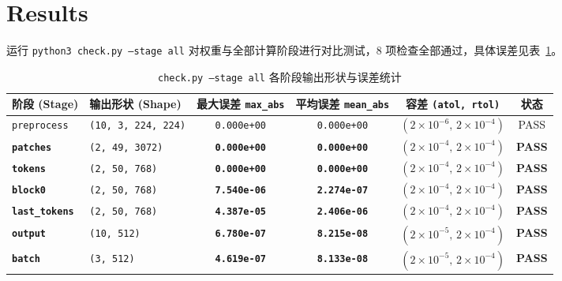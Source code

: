 \documentclass[a4paper,11pt]{article}
\newcommand{\mywork}[1]{\textcolor{myred}{\textbf{#1}}}
\begin{document}
\section{Results}

运行 \texttt{python3 check.py --stage all} 对权重与全部计算阶段进行对比测试，8 项检查全部通过，具体误差见表~\ref{tab:stage-errors}。

\begin{table}[H]
    \centering
    \caption{\texttt{check.py --stage all} 各阶段输出形状与误差统计}
    \label{tab:stage-errors}
    \small
    \setlength{\tabcolsep}{5.5pt}
    \begin{tabular}{llcccc}
        \toprule
        \textbf{阶段 (Stage)} & \textbf{输出形状 (Shape)} & \textbf{最大误差 \texttt{max\_abs}} & \textbf{平均误差 \texttt{mean\_abs}} & \textbf{容差 \texttt{(atol, rtol)}} & \textbf{状态} \\
        \midrule
        \texttt{preprocess}   & \texttt{(10, 3, 224, 224)} & \texttt{0.000e+00} & \texttt{0.000e+00} & $(2\times 10^{-6},\, 2\times 10^{-4})$ & PASS \\
        \mywork{\texttt{patches}}      & \texttt{(2, 49, 3072)}     & \mywork{\texttt{0.000e+00}} & \mywork{\texttt{0.000e+00}} & $(2\times 10^{-4},\, 2\times 10^{-4})$ & \mywork{PASS} \\
        \mywork{\texttt{tokens}}       & \texttt{(2, 50, 768)}      & \mywork{\texttt{0.000e+00}} & \mywork{\texttt{0.000e+00}} & $(2\times 10^{-4},\, 2\times 10^{-4})$ & \mywork{PASS} \\
        \mywork{\texttt{block0}}       & \texttt{(2, 50, 768)}      & \mywork{\texttt{7.540e-06}} & \mywork{\texttt{2.274e-07}} & $(2\times 10^{-4},\, 2\times 10^{-4})$ & \mywork{PASS} \\
        \mywork{\texttt{last\_tokens}} & \texttt{(2, 50, 768)}      & \mywork{\texttt{4.387e-05}} & \mywork{\texttt{2.406e-06}} & $(2\times 10^{-4},\, 2\times 10^{-4})$ & \mywork{PASS} \\
        \mywork{\texttt{output}}       & \texttt{(10, 512)}         & \mywork{\texttt{6.780e-07}} & \mywork{\texttt{8.215e-08}} & $(2\times 10^{-5},\, 2\times 10^{-4})$ & \mywork{PASS} \\
        \mywork{\texttt{batch}}        & \texttt{(3, 512)}          & \mywork{\texttt{4.619e-07}} & \mywork{\texttt{8.133e-08}} & $(2\times 10^{-5},\, 2\times 10^{-4})$ & \mywork{PASS} \\
        \bottomrule
    \end{tabular}
\end{table}
\end{document}
